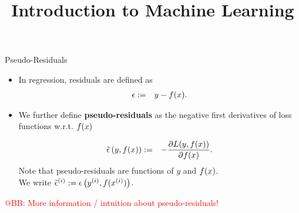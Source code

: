 




\newcommand{\titlefigure}{figure_man/optimization_steps.jpeg}
\newcommand{\learninggoals}{
\item Know the concept of pseudo-residuals 
\item Understand the relationship between pseudo-residuals and gradient descent 
}

\title{Introduction to Machine Learning}
\date{}






\begin{vbframe}{Pseudo-Residuals}

\begin{itemize}
	\item In regression, residuals are defined as 
	\begin{eqnarray*}
		\epsilon &:=& y - f(x).
	\end{eqnarray*}
\item We further define \textbf{pseudo-residuals} as the negative first derivatives of loss functions w.r.t. $f(x)$

  \begin{eqnarray*}
    \tilde \eps\left(y, \fx\right) &:=& - \frac{\partial \Lxy}{\partial \fx}.  %
  \end{eqnarray*}
  Note that pseudo-residuals are functions of $y$ and $f(x)$. \\ We write $\tilde {\epsilon}^{(i)} := \epsilon\left(y^{(i)}, f(x^{(i)})\right)$. 
\end{itemize}

\lz 

\textcolor{red}{@BB: More information / intuition about pseudo-residuals! }

\end{vbframe}



